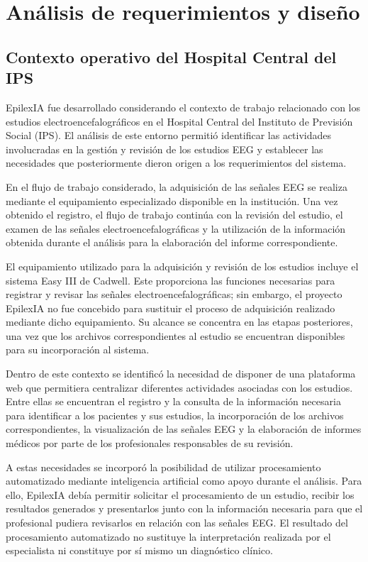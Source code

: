 \chapter{Análisis de requerimientos y diseño}
\label{cap:analisis-diseno}

\section{Contexto operativo del Hospital Central del IPS}
\label{sec:contexto-operativo-ips}

EpilexIA fue desarrollado considerando el contexto de trabajo relacionado con
los estudios electroencefalográficos en el Hospital Central del Instituto de
Previsión Social (IPS). El análisis de este entorno permitió identificar las
actividades involucradas en la gestión y revisión de los estudios EEG y
establecer las necesidades que posteriormente dieron origen a los
requerimientos del sistema.

En el flujo de trabajo considerado, la adquisición de las señales EEG se
realiza mediante el equipamiento especializado disponible en la institución.
Una vez obtenido el registro, el flujo de trabajo continúa con la revisión
del estudio, el examen de las señales electroencefalográficas y la utilización
de la información obtenida durante el análisis para la elaboración del informe
correspondiente.

El equipamiento utilizado para la adquisición y revisión de los estudios
incluye el sistema Easy III de Cadwell. Este proporciona las funciones
necesarias para registrar y revisar las señales electroencefalográficas; sin
embargo, el proyecto EpilexIA no fue concebido para sustituir el proceso de
adquisición realizado mediante dicho equipamiento. Su alcance se concentra en
las etapas posteriores, una vez que los archivos correspondientes al estudio
se encuentran disponibles para su incorporación al sistema.

Dentro de este contexto se identificó la necesidad de disponer de una
plataforma web que permitiera centralizar diferentes actividades asociadas con
los estudios. Entre ellas se encuentran el registro y la consulta de la información necesaria para identificar a los pacientes y sus estudios, la incorporación de los archivos correspondientes, la visualización de las señales EEG y la elaboración de informes médicos por parte de los profesionales responsables de su revisión.

A estas necesidades se incorporó la posibilidad de utilizar procesamiento
automatizado mediante inteligencia artificial como apoyo durante el análisis.
Para ello, EpilexIA debía permitir solicitar el procesamiento de un estudio,
recibir los resultados generados y presentarlos junto con la información
necesaria para que el profesional pudiera revisarlos en relación con las
señales EEG. El resultado del procesamiento automatizado no sustituye la
interpretación realizada por el especialista ni constituye por sí mismo un
diagnóstico clínico.

